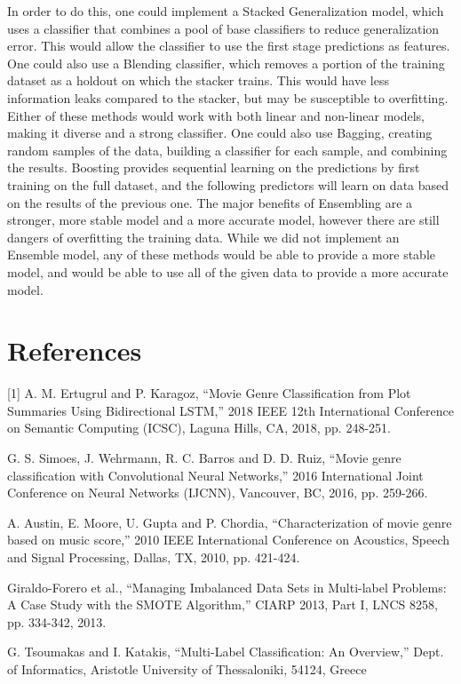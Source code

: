 \documentclass[sigconf]{acmart}
\begin{document}
In order to do this, one could implement a Stacked Generalization model, which uses a classifier that combines a pool of base classifiers to reduce generalization error. This would allow the classifier to use the first stage predictions as features. One could also use a Blending classifier, which removes a portion of the training dataset as a holdout on which the stacker trains. This would have less information leaks compared to the stacker, but may be susceptible to overfitting. Either of these methods would work with both linear and non-linear models, making it diverse and a strong classifier. One could also use Bagging, creating random samples of the data, building a classifier for each sample, and combining the results. Boosting provides sequential learning on the predictions by first training on the full dataset, and the following predictors will learn on data based on the results of the previous one. The major benefits of Ensembling are a stronger, more stable model and a more accurate model, however there are still dangers of overfitting the training data. While we did not implement an Ensemble model, any of these methods would be able to provide a more stable model, and would be able to use all of the given data to provide a more accurate model.

\section{References}

[1] A. M. Ertugrul and P. Karagoz, ``Movie Genre Classification from Plot Summaries Using Bidirectional LSTM,'' 2018 IEEE 12th International Conference on Semantic Computing (ICSC), Laguna Hills, CA, 2018, pp. 248-251.

\noindent[2] G. S. Simoes, J. Wehrmann, R. C. Barros and D. D. Ruiz, ``Movie genre classification with Convolutional Neural Networks,'' 2016 International Joint Conference on Neural Networks (IJCNN), Vancouver, BC, 2016, pp. 259-266.

\noindent[3] A. Austin, E. Moore, U. Gupta and P. Chordia, ``Characterization of movie genre based on music score,'' 2010 IEEE International Conference on Acoustics, Speech and Signal Processing, Dallas, TX, 2010, pp. 421-424.

\noindent[4] Giraldo-Forero et al., ``Managing Imbalanced Data Sets in Multi-label Problems: A Case Study with the SMOTE Algorithm,'' CIARP 2013, Part I, LNCS 8258, pp. 334-342, 2013.

\noindent[5] G. Tsoumakas and I. Katakis, ``Multi-Label Classification: An Overview,''
Dept. of Informatics, Aristotle University of Thessaloniki, 54124, Greece 
\end{document}
